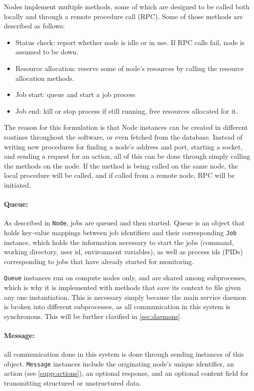 \documentclass[sigconf]{acmart}
\begin{document}
Nodes implement multiple methods, some of which are designed to be called both locally and through a remote procedure call (RPC).
Some of those methods are described as follows:
\begin{itemize}
    \item Status check: report whether node is idle or in use. If RPC calls fail, node is assumed to be down.
    \item Resource allocation: reserve some of node's resources by calling the resource allocation methods.
    \item Job start: queue and start a job process
    \item Job end: kill or stop process if still running, free resources allocated for it.
\end{itemize}

The reason for this formulation is that Node instances can be created in different routines throughout the software, or even
fetched from the database. Instead of writing new procedures for finding a node's address and port, starting a socket, and
sending a request for an action, all of this can be done through simply calling the methods on the node.
If the method is being called on the same node, the local procedure will be called, and if called from a remote node, RPC will
be initiated.

\paragraph{Queue:} As described in \verb|Node|, jobs are queued and then started. 
Queue is an object that holds key-value mappings between job identifiers and their corresponding \verb|Job| instance, which
holds the information necessary to start the jobs (command, working directory, user id, environment variables), as well as
process ids (PIDs) corresponding to jobs that have already started for monitoring.

\verb|Queue| instances run on compute nodes only, and are shared among subprocesses, which is why it is implemented with methods
that save its context to file given any one instantiation. This is necessary simply because the main service daemon is broken
into different subprocesses, as all communication in this system is synchronous. This will be further clarified in
\cref{sec:daemons}.

\paragraph{Message:} all communication done in this system is done through sending instances of this object.
\verb|Message| instances include the originating node's unique identifier, an action (see \cref{supp:actions}), an optional
response, and an optional content field for transmitting structured or unstructured data.
\end{document}
